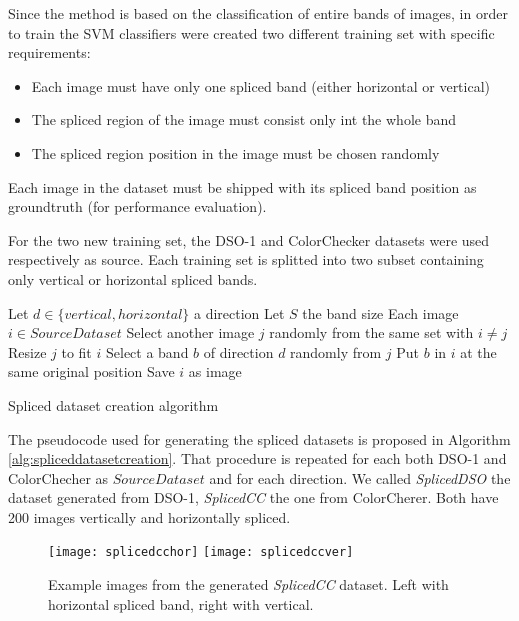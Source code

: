 Since the method is based on the classification of entire bands of images, in order to train the SVM classifiers were created two different training set with specific requirements:
\begin{itemize}
\item Each image must have only one spliced band (either horizontal or vertical)
\item The spliced region of the image must consist only int the whole band
\item The spliced region position in the image must be chosen randomly
\end{itemize}

Each image in the dataset must be shipped with its spliced band position as groundtruth (for performance evaluation).

For the two new training set, the DSO-1 and ColorChecker datasets were used respectively as source. Each training set is splitted into two subset containing only vertical or horizontal spliced bands.

\begin{algorithm}[!h]
\begin{algorithmic}[1]
\State Let $d \in \{vertical, horizontal\}$ a direction
\State Let $S$ the band size
\For Each image {$i \in SourceDataset$}
\State Select another image $j$ randomly from the same set with $i \neq j$
\State Resize $j$ to fit $i$
\State Select a band $b$ of direction $d$ randomly from $j$
\State Put $b$ in $i$ at the same original position
\State Save $i$ as image
\EndFor
\end{algorithmic}\caption{Spliced dataset creation algorithm}\label{alg:spliceddatasetcreation}
\end{algorithm}

The pseudocode used for generating the spliced datasets is proposed in Algorithm \ref{alg:spliceddatasetcreation}. That procedure is repeated for each both DSO-1 and ColorChecher as $SourceDataset$ and for each direction. We called \emph{SplicedDSO} the dataset generated from DSO-1, \emph{SplicedCC} the one from ColorCherer. Both have 200 images vertically and horizontally spliced.

\begin{figure}[!htb]
  \texttt{[image: splicedcchor]}
\endminipage\hfill
{}
  \texttt{[image: splicedccver]}
\endminipage
\caption{Example images from the generated \emph{SplicedCC} dataset. Left with horizontal spliced band, right with vertical.}\label{fig:splicedccsamples}
\end{figure}


